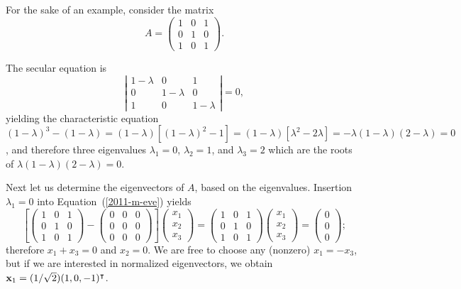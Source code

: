 {\color{blue}
\bexample
For the sake of an example, consider  the
{matrix}
\begin{equation}
A=
\begin{pmatrix}
1&0&1\\
0&1&0\\
1&0&1
\end{pmatrix}.
\label{2017-m-ch-fdvs-e-eev1}
\end{equation}

The secular equation is
$$
\left|
\begin{matrix}
1-\lambda &0&1\\
0&1-\lambda &0\\
1&0&1-\lambda
\end{matrix}
\right| = 0,
$$
yielding the characteristic equation
$
(1-\lambda )^3 -(1-\lambda ) =(1-\lambda )[(1-\lambda )^2 - 1]=(1-\lambda )[\lambda ^2 - 2\lambda ]= - \lambda (1-\lambda )(2-\lambda ) =0$,
and therefore three  eigenvalues
$\lambda_1=0$,
$\lambda_2=1$, and
$\lambda_3=2$ which are the roots of $\lambda (1-\lambda )(2-\lambda ) =0$.

Next let us determine the eigenvectors of $A$, based on the eigenvalues.
Insertion  $\lambda_1=0$ into Equation~(\ref{2011-m-eve}) yields
\begin{equation}
\left[
\begin{pmatrix}
1&0&1\\
0&1&0\\
1&0&1
\end{pmatrix}  -
\begin{pmatrix}
0&0&0\\
0&0&0\\
0&0&0
\end{pmatrix}
\right]
\begin{pmatrix}
x_1\\
x_2\\
x_3
\end{pmatrix}
=
\begin{pmatrix}
1&0&1\\
0&1&0\\
1&0&1
\end{pmatrix}
\begin{pmatrix}
x_1\\
x_2\\
x_3
\end{pmatrix}
=
\begin{pmatrix}
0\\
0\\
0
\end{pmatrix}
;
\end{equation}
therefore $x_1+x_3=0$ and $x_2=0$.
We are free to choose any (nonzero) $x_1=-x_3$,
but if we are interested in normalized eigenvectors, we obtain
${\bf x}_1 =(1/\sqrt{2})(1,0,-1)^\intercal $.

}

